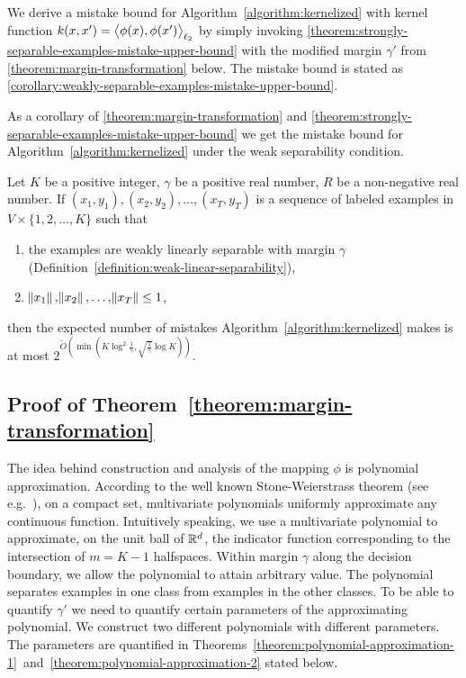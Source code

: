 We derive a mistake bound for Algorithm~\ref{algorithm:kernelized} with kernel
function $k(x,x') = \left\langle \phi(x), \phi(x') \right\rangle_{\ell_2}$ by simply invoking
\autoref{theorem:strongly-separable-examples-mistake-upper-bound} with the
modified margin $\gamma'$ from \autoref{theorem:margin-transformation} below.
The mistake bound is stated as \autoref{corollary:weakly-separable-examples-mistake-upper-bound}.

As a corollary of \autoref{theorem:margin-transformation} and
\autoref{theorem:strongly-separable-examples-mistake-upper-bound}
we get the mistake bound for Algorithm~\ref{algorithm:kernelized}
under the weak separability condition.

\begin{corollary}
\label{corollary:weakly-separable-examples-mistake-upper-bound}
Let $K$ be a positive
integer, $\gamma$ be a positive real number, $R$ be a non-negative real number. If
$(x_1, y_1), (x_2, y_2), \dots, (x_T, y_T)$ is a sequence of labeled examples in
$V \times \{1,2,\dots,K\}$ such that
\begin{enumerate}
  \item the examples are weakly linearly separable with margin $\gamma$ (Definition~\ref{definition:weak-linear-separability}),
  \item $\norm{x_1}, \norm{x_2}, \dots, \norm{x_T} \le 1$,
\end{enumerate}
then the expected number of mistakes
Algorithm~\ref{algorithm:kernelized}
makes is at most $2^{\widetilde{O}(\min(K \log^2
\frac{1}{\gamma}, \sqrt{\frac{1}{\gamma}} \log K))}$.
\end{corollary}

\subsection{Proof of Theorem~\ref{theorem:margin-transformation}}
The idea behind construction and analysis of the mapping $\phi$ is polynomial
approximation. According to the well known Stone-Weierstrass theorem (see
e.g.~\citet[Section~10.10]{Davidson-Donsig-2010}), on a compact set,
multivariate polynomials uniformly approximate any continuous function.
Intuitively speaking, we use a multivariate polynomial to approximate, on the
unit ball of $\mathbb{R}^d$, the indicator function corresponding to the intersection of
$m=K-1$ halfspaces. Within margin $\gamma$ along the decision boundary, we allow
the polynomial to attain arbitrary value. The polynomial separates examples in
one class from examples in the other classes. To be able to quantify $\gamma'$
we need to quantify certain parameters of the approximating polynomial. We
construct two different polynomials with different parameters. The parameters
are quantified in
Theorems~\ref{theorem:polynomial-approximation-1}~and~\ref{theorem:polynomial-approximation-2}
stated below.

